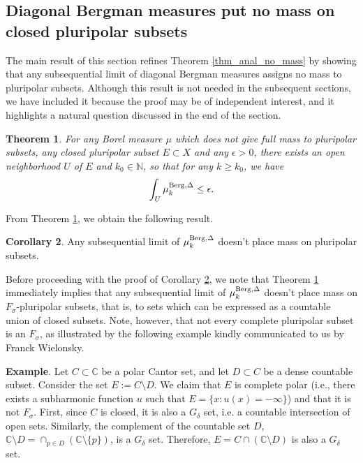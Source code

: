 \documentclass[12pt]{article}
\numberwithin{equation}{section}
\theoremstyle{theorem}
\newtheorem{thm}{Theorem}[section]
\theoremstyle{definition}
\newtheorem{cor}[thm]{Corollary}
\theoremstyle{remark}
\newcommand{\nat}{\mathbb{N}}
\begin{document}
	\subsection{Diagonal Bergman measures put no mass on closed pluripolar subsets}\label{sect_bergm_pp}
	The main result of this section refines Theorem \ref{thm_anal_no_mass} by showing that any subsequential limit of diagonal Bergman measures assigns no mass to pluripolar subsets.  
	Although this result is not needed in the subsequent sections, we have included it because the proof may be of independent interest, and it highlights a natural question discussed in the end of the section.
	\par 
	\begin{thm}\label{thm_pp_no_mass}
		For any Borel measure $\mu$ which does not give full mass to pluripolar subsets, any closed pluripolar subset $E \subset X$ and any $\epsilon > 0$, there exists an open neighborhood $U$ of $E$ and $k_0 \in \nat$, so that for any $k \geq k_0$, we have
		\begin{equation}\label{eq_pp_no_mass}
			\int_U \mu_k^{\rm{Berg}, \Delta} \leq \epsilon.
		\end{equation}
	\end{thm}
	From Theorem \ref{thm_pp_no_mass}, we obtain the following result.
	\begin{cor}\label{cor_nomalss}
		Any subsequential limit of $\mu_k^{\rm{Berg}, \Delta}$ doesn't place mass on pluripolar subsets.
	\end{cor}
	Before proceeding with the proof of Corollary \ref{cor_nomalss}, we note that Theorem \ref{thm_pp_no_mass} immediately implies that any subsequential limit of $\mu_k^{\rm{Berg}, \Delta}$ doesn't place mass on $F_{\sigma}$-pluripolar subsets, that is, to sets which can be expressed as a countable union of closed subsets.
	Note, however, that not every complete pluripolar subset is an $F_{\sigma}$, as illustrated by the following example kindly communicated to us by Franck Wielonsky.
	\par 
	\textbf{Example}.
	Let $C \subset \mathbb{C}$ be a polar Cantor set, and let $D \subset C$ be a dense countable subset. Consider the set $E := C \setminus D$. 
	We claim that $E$ is complete polar (i.e., there exists a subharmonic function $u$ such that $E = \{x : u(x) = -\infty\}$) and that it is not $F_\sigma$.  
	First, since $C$ is closed, it is also a $G_\delta$ set, i.e. a countable intersection of open sets. 
	Similarly, the complement of the countable set $D$, $\mathbb{C} \setminus D = \cap_{p \in D} (\mathbb{C} \setminus \{p\})$, is a $G_\delta$ set. Therefore, $E = C \cap (\mathbb{C} \setminus D)$ is also a $G_\delta$ set. 
\end{document}
